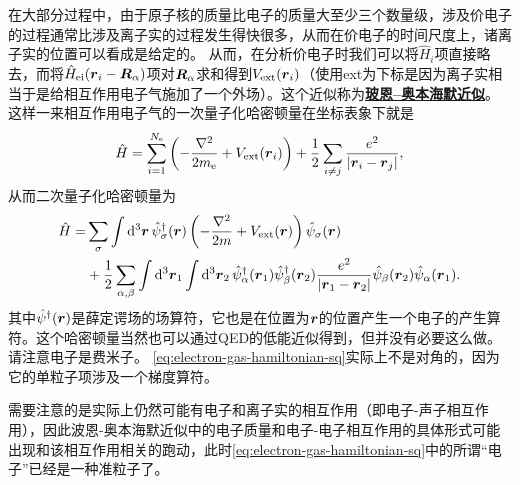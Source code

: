 \documentclass[hyperref, UTF8, a4paper]{ctexart}
\newcommand*{\concept}[1]{\underline{\textbf{#1}}}
\begin{document}
在大部分过程中，由于原子核的质量比电子的质量大至少三个数量级，涉及价电子的过程通常比涉及离子实的过程发生得快很多，从而在价电子的时间尺度上，诸离子实的位置可以看成是给定的。
从而，在分析价电子时我们可以将$\hat{H}_i$项直接略去，而将$\hat{H}_\text{ei}(\vb*{r}_i-\vb*{R}_\alpha)$项对$\vb*{R}_\alpha$求和得到$V_\text{ext}(\vb*{r}_i)$（使用ext为下标是因为离子实相当于是给相互作用电子气施加了一个外场）。这个近似称为\concept{玻恩–奥本海默近似}。这样一来相互作用电子气的一次量子化哈密顿量在坐标表象下就是
\begin{equation}
    \hat{H} = \sum_{i=1}^{N_\text{e}} \left( - \frac{\laplacian}{2m_\text{e}} + V_\text{ext}(\vb*{r}_i)\right) + \frac{1}{2} \sum_{i\neq j} \frac{e^2}{\abs{\vb*{r}_i - \vb*{r}_j}},
    \label{eq:electron-gas-hamiltonian}
\end{equation}
从而二次量子化哈密顿量为
\begin{equation}
    \begin{aligned}
        \hat{H} = &\sum_{\sigma} \int \dd[3]{\vb*{r}} \hat{\psi}_\sigma^\dagger(\vb*{r}) \left( - \frac{\laplacian}{2m} + V_\text{ext}(\vb*{r}) \right) \hat{\psi}_\sigma(\vb*{r}) \\
        &+ \frac{1}{2} \sum_{\alpha, \beta} \int \dd[3]{\vb*{r}_1} \int \dd[3]{\vb*{r}_2} 
        \hat{\psi}_\alpha^\dagger (\vb*{r}_1) \hat{\psi}_\beta^\dagger (\vb*{r}_2) \frac{e^2}{\abs{\vb*{r}_1 - \vb*{r}_2}} \hat{\psi}_\beta (\vb*{r}_2) \hat{\psi}_\alpha (\vb*{r}_1). 
    \end{aligned}
    \label{eq:electron-gas-hamiltonian-sq}
\end{equation}
其中$\hat{\psi}^\dagger(\vb*{r})$是薛定谔场的场算符，它也是在位置为$\vb*{r}$的位置产生一个电子的产生算符。这个哈密顿量当然也可以通过QED的低能近似得到，但并没有必要这么做。请注意电子是费米子。
\eqref{eq:electron-gas-hamiltonian-sq}实际上不是对角的，因为它的单粒子项涉及一个梯度算符。

需要注意的是实际上仍然可能有电子和离子实的相互作用（即电子-声子相互作用），因此波恩-奥本海默近似中的电子质量和电子-电子相互作用的具体形式可能出现和该相互作用相关的跑动，此时\eqref{eq:electron-gas-hamiltonian-sq}中的所谓“电子”已经是一种准粒子了。
\end{document}
